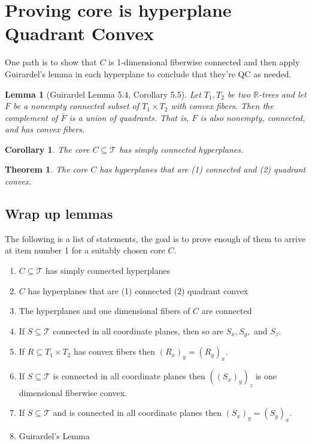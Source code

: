 \documentclass{article}
\newcommand{\sxyz}{((S_x)_y)_z}
\theoremstyle{mystyle}
\newtheorem{thm}{Theorem}[section]
\newtheorem{lem}{Lemma}[section]
\newtheorem*{cor*}{Corollary}
\theoremstyle{remark}
\begin{document}
\section{Proving core is hyperplane Quadrant Convex}
One path is to show that \(C\) is 1-dimensional fiberwise connected and then apply Guirardel's lemma in each hyperplane to conclude that they're QC as needed.

\begin{lem}
	[Guirardel Lemma 5.4, Corollary 5.5]
 \label{lem:guirardel} 
	Let \(T_{1} , T_{2}\) be two \(\mathbb{R}\)-trees and let \(F\) be a nonempty connected subset of \(T_{1} \times T_{2}\) with convex fibers. Then the complement of \(\overline{F}\) is a union of quadrants. That is, \(\overline{F}\) is also nonempty, connected, and has convex fibers.
\end{lem}

\begin{cor*}
    The core \(C \subseteq \mathscr{T}\) has simply connected hyperplanes.
\end{cor*}
\begin{thm}
    The core \(C\) has hyperplanes that are (1) connected and (2) quadrant convex.
\end{thm}

\subsection{Wrap up lemmas}
The following is a list of statements, the goal is to prove enough of them to arrive at item number 1 for a suitably chosen core \(C\).
\begin{enumerate}
    \item \(C \subseteq \mathscr{T}\) has simply connected hyperplanes
    \item \(C\) has hyperplanes that are (1) connected (2) quadrant convex
    \item The hyperplanes and one dimensional fibers of \(C\) are connected
    \item If \(S \subseteq \mathscr{T}\) connected in all coordinate planes, then so are \(S_{x}, S_{y},\) and \(S_{z}\).
    \item If \(R \subseteq T_{1} \times T_{2}\) has convex fibers then \( \left( R_{x} \right)_{y} = \left( R_{y} \right)_{x}\).
    \item If \(S \subseteq \mathscr{T}\) is connected in all coordinate planes then \(\sxyz\) is one dimensional fiberwise convex. 
    \item \label{state:7} If \(S \subseteq \mathscr{T}\) and is connected in all coordinate planes then \( \left( S_{x} \right)_{y} = \left( S_{y} \right)_{x}\).
    \item Guirardel's Lemma
\end{enumerate}
\end{document}
